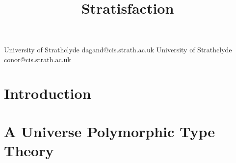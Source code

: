 \documentclass[preprint
              , authoryear
              , onecolumn
              ]{sigplanconf}
\begin{document}






\title{Stratisfaction}


           {University of Strathclyde}
           {dagand@cis.strath.ac.uk}
           {University of Strathclyde}
           {conor@cis.strath.ac.uk}

\maketitle

\ColourEpigram



\begin{abstract}
\end{abstract}





\section{Introduction}




\section{A Universe Polymorphic Type Theory}
\end{document}
